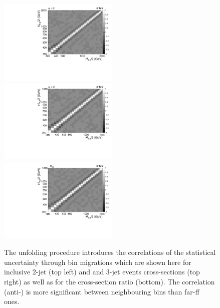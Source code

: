 \begin{figure}[!h]
 \begin{center}
 \hspace*{-3mm}\includegraphics[width=0.51\textwidth]{Plots_HT_2_150/Correlation_Matrix_NLO_2_ite4.pdf}%
 ~~\includegraphics[width=0.51\textwidth]{Plots_HT_2_150/Correlation_Matrix_NLO_3_ite4.pdf}\\
 \includegraphics[width=0.51\textwidth]{Plots_HT_2_150/Correlation_Matrix_NLO_Ratio_32_ite4.pdf}
 \caption[The unfolding procedure introduces the correlations of the statistical uncertainty through bin migrations.]{The unfolding procedure introduces the correlations of the statistical uncertainty through bin migrations which are shown here for inclusive 2-jet (top left) and and 3-jet events cross-sections (top right) as well as for the cross-section ratio \ratio (bottom). The correlation (anti-) is more significant between neighbouring bins than far-ff ones.}
 \label{fig:corr}
 \end{center}
\end{figure}

